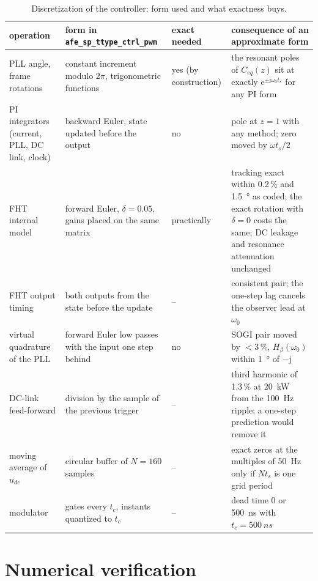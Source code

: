 \documentclass[10pt,a4paper]{scrartcl}
\newcommand{\ts}{t_s}
\newcommand{\tc}{t_c}
\newcommand{\wo}{\omega_0}
\newcommand{\jj}{\mathrm{j}}
\newcommand{\ee}{\mathrm{e}}
\newcommand{\code}[1]{\texttt{#1}}
\newcommand{\Ceq}{C_{eq}}
\begin{document}
\begin{onehalfspace}
\begin{table}[htb]
\centering\small
\caption{Discretization of the controller: form used and what exactness buys.}
\label{tab:summary}
\begin{tabular}{@{}R{3.4cm}R{4.6cm}R{1.5cm}R{6.2cm}@{}}
\toprule
operation & form in \code{afe\_sp\_ttype\_ctrl\_pwm} & exact needed & consequence of an approximate form \\
\midrule
PLL angle, frame rotations & constant increment modulo $2\pi$, trigonometric functions & yes (by construction) & the resonant poles of $\Ceq(z)$ sit at exactly $\ee^{\pm\jj\wo\ts}$ for any PI form \\
PI integrators (current, PLL, DC link, clock) & backward Euler, state updated before the output & no & pole at $z = 1$ with any method; zero moved by $\omega\ts/2$ \\
FHT internal model & forward Euler, $\delta = 0.05$, gains placed on the same matrix & practically & tracking exact within 0.2\,\% and \SI{1.5}{\degree} as coded; the exact rotation with $\delta = 0$ costs the same; DC leakage and resonance attenuation unchanged \\
FHT output timing & both outputs from the state before the update & -- & consistent pair; the one-step lag cancels the observer lead at $\wo$ \\
virtual quadrature of the PLL & forward Euler low passes with the input one step behind & no & SOGI pair moved by $< 3$\,\%, $H_\beta(\wo)$ within \SI{1}{\degree} of $-\jj$ \\
DC-link feed-forward & division by the sample of the previous trigger & -- & third harmonic of 1.3\,\% at \SI{20}{kW} from the \SI{100}{Hz} ripple; a one-step prediction would remove it \\
moving average of $u_{dc}$ & circular buffer of $N = 160$ samples & -- & exact zeros at the multiples of \SI{50}{Hz} only if $N\ts$ is one grid period \\
modulator & gates every $\tc$, instants quantized to $\tc$ & -- & dead time 0 or \SI{500}{ns} with $\tc = \SI{500}{ns}$ \\
\bottomrule
\end{tabular}
\end{table}

\section{Numerical verification}
\label{sec:verification}


\end{onehalfspace}
\end{document}
